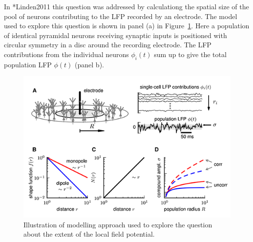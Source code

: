
In \citeasnoun**{Linden2011} this question was addressed by calculationg the spatial size of the pool of neurons 
contributing to the LFP recorded by an electrode. The model used to explore this question
is shown in panel (a) in Figure~\ref{LFP:fig:how-local}.
Here a population of identical pyramidal neurons receiving synaptic inputs is positioned
with circular symmetry in a disc around the recording electrode. The LFP contributions from the individual neurons 
$\phi_i(t)$ sum up to give the total population LFP  $\phi(t)$ (panel b).

\begin{figure}
\begin{center}
\includegraphics{Figures/LFP/LFP-how-local-is-the-LFP-w90-r150}
\end{center}
\caption[]{Illustration of modelling approach used to explore the question
about the extent of the local field potential.
}
\label{LFP:fig:how-local}
\end{figure}
  
